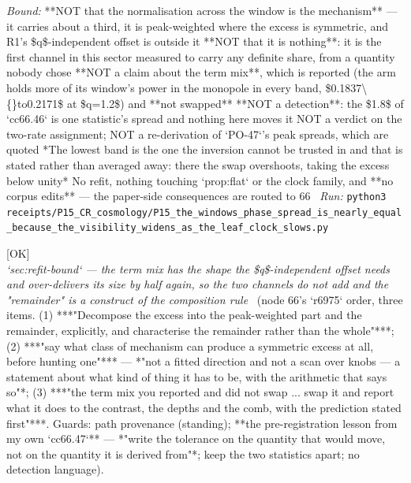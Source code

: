 \begin{description}
 \emph{Bound:}  **NOT that the normalisation across the window is the mechanism** --- it carries about a third, it is peak-weighted where the excess is symmetric, and R1's \$q\$-independent offset is outside it  **NOT that it is nothing**: it is the first channel in this sector measured to carry any definite share, from a quantity nobody chose  **NOT a claim about the term mix**, which is reported (the arm holds more of its window's power in the monopole in every band, \$0.1837\textbackslash\{\}to0.2171\$ at \$q=1.2\$) and **not swapped**  **NOT a detection**: the \$1.8\$ of `cc66.46` is one statistic's spread and nothing here moves it  NOT a verdict on the two-rate assignment; NOT a re-derivation of `PO-47`'s peak spreads, which are quoted  *The lowest band is the one the inversion cannot be trusted in and that is stated rather than averaged away: there the swap overshoots, taking the excess below unity*  No refit, nothing touching `prop:flat` or the clock family, and **no corpus edits** --- the paper-side consequences are routed to 66
\ \emph{Run:} \texttt{python3 receipts/P15\_CR\_cosmology/P15\_the\_windows\_phase\_spread\_is\_nearly\_equal\_because\_the\_visibility\_widens\_as\_the\_leaf\_clock\_slows.py}
\item[\rcptlabel{P15_the_term_mix_has_the_shape_the_offset_needs_and_over_delivers_its_size}{P15R195}\textbf{P15R195}\quad\texttt{P15\_the\_term\_mix\_has\_the\_shape\_the\_offset\_needs\_and\_over\_delivers\_its\_size}]\hfill\textsf{[OK]}\\
\textit{`sec:refit-bound` --- the term mix has the shape the \$q\$-independent offset needs and over-delivers its size by half again, so the two channels do not add and the "remainder" is a construct of the composition rule} \ (node 66's `r6975` order, three items. (1) ***"Decompose the excess into the peak-weighted part and the remainder, explicitly, and characterise the remainder rather than the whole"***; (2) ***"say what class of mechanism can produce a symmetric excess at all, before hunting one"*** ---  *"not a fitted direction and not a scan over knobs --- a statement about what kind of thing it has to be, with the arithmetic that says so"*; (3) ***"the term mix you reported and did not swap ... swap it and report what it does to the contrast, the depths and the comb, with the prediction stated first"***.  Guards: path provenance (standing);  **the pre-registration lesson from my own `cc66.47`** --- *"write the tolerance on the quantity that would move, not on the quantity it is derived from"*; keep the two statistics apart; no detection language). 

\end{description}
